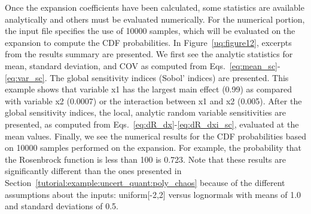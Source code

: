Once the expansion coefficients have been calculated, some statistics
are available analytically and others must be evaluated numerically.
For the numerical portion, the input file specifies the use of 10000
samples, which will be evaluated on the expansion to compute the CDF
probabilities.  In Figure~\ref{uq:figure12}, excerpts from the results
summary are presented.  We first see the analytic statistics for 
mean, standard deviation, and COV as computed from 
Eqs.~\ref{eq:mean_sc}-\ref{eq:var_sc}.  The global sensitivity indices
(Sobol' indices) are presented. This example shows that variable 
x1 has the largest main effect (0.99) as compared with variable 
x2 (0.0007) or the interaction between x1 and x2 (0.005). 
After the global sensitivity indices, the local, analytic random 
variable sensitivities are presented, as computed from
Eqs.~\ref{eq:dR_dx}-\ref{eq:dR_dxi_sc}, evaluated at the mean values.
Finally, we see the numerical results for the CDF probabilities based
on 10000 samples performed on the expansion.  For example, the probability 
that the Rosenbrock function is less than 100 is 0.723.  Note that these 
results are significantly different than the ones presented in 
Section~\ref{tutorial:example:uncert_quant:poly_chaos} because of 
the different assumptions about the inputs: uniform[-2,2] versus
lognormals with means of 1.0 and standard deviations of 0.5. 
